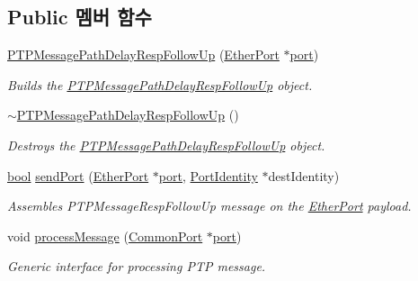\subsection*{Public 멤버 함수}
\begin{DoxyCompactItemize}
\item 
\hyperlink{class_p_t_p_message_path_delay_resp_follow_up_a1466b66b7f62168ad309fd1aa05e8b56}{P\+T\+P\+Message\+Path\+Delay\+Resp\+Follow\+Up} (\hyperlink{class_ether_port}{Ether\+Port} $\ast$\hyperlink{gst__avb__playbin_8c_a63c89c04d1feae07ca35558055155ffb}{port})
\begin{DoxyCompactList}\small\item\em Builds the \hyperlink{class_p_t_p_message_path_delay_resp_follow_up}{P\+T\+P\+Message\+Path\+Delay\+Resp\+Follow\+Up} object. \end{DoxyCompactList}\item 
\hyperlink{class_p_t_p_message_path_delay_resp_follow_up_abd1645be141abcbf90d9ae4da655e9f1}{$\sim$\+P\+T\+P\+Message\+Path\+Delay\+Resp\+Follow\+Up} ()
\begin{DoxyCompactList}\small\item\em Destroys the \hyperlink{class_p_t_p_message_path_delay_resp_follow_up}{P\+T\+P\+Message\+Path\+Delay\+Resp\+Follow\+Up} object. \end{DoxyCompactList}\item 
\hyperlink{avb__gptp_8h_af6a258d8f3ee5206d682d799316314b1}{bool} \hyperlink{class_p_t_p_message_path_delay_resp_follow_up_a0c6f07200fa46634360d356ebb10dfe0}{send\+Port} (\hyperlink{class_ether_port}{Ether\+Port} $\ast$\hyperlink{gst__avb__playbin_8c_a63c89c04d1feae07ca35558055155ffb}{port}, \hyperlink{class_port_identity}{Port\+Identity} $\ast$dest\+Identity)
\begin{DoxyCompactList}\small\item\em Assembles P\+T\+P\+Message\+Resp\+Follow\+Up message on the \hyperlink{class_ether_port}{Ether\+Port} payload. \end{DoxyCompactList}\item 
void \hyperlink{class_p_t_p_message_path_delay_resp_follow_up_a45670a42f5684252d52543f9ed3a1551}{process\+Message} (\hyperlink{class_common_port}{Common\+Port} $\ast$\hyperlink{gst__avb__playbin_8c_a63c89c04d1feae07ca35558055155ffb}{port})
\begin{DoxyCompactList}\small\item\em Generic interface for processing P\+TP message. \end{DoxyCompactList}\item 

\end{DoxyCompactItemize}

